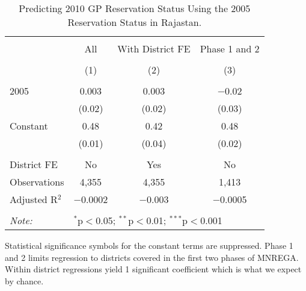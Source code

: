 \begin{table}[!htbp]
\centering
\begin{threeparttable}

  \caption{Predicting 2010 GP Reservation Status Using the 2005 Reservation Status in Rajastan.} 
  \label{rand_or_no_raj} 
\scriptsize 
\begin{tabular}{@{\extracolsep{0pt}}lccc} 
\\[-1.8ex]\hline 
\hline \\[-1.8ex] 
 & All & With District FE & Phase 1 and 2 \\ 
\\[-1.8ex] & (1) & (2) & (3)\\ 
\hline \\[-1.8ex] 
 2005 & 0.003 & 0.003 & $-$0.02 \\ 
  & (0.02) & (0.02) & (0.03) \\ 
  Constant & 0.48 & 0.42 & 0.48 \\ 
  & (0.01) & (0.04) & (0.02) \\ 
 \hline \\[-1.8ex] 
District FE & No & Yes & No \\ 
Observations & 4,355 & 4,355 & 1,413 \\ 
Adjusted R$^{2}$ & $-$0.0002 & $-$0.003 & $-$0.0005 \\ 
\hline 
\hline \\[-1.8ex] 
\textit{Note:}  & \multicolumn{3}{l}{$^{*}$p$<$0.05; $^{**}$p$<$0.01; $^{***}$p$<$0.001} \\ 
\end{tabular} 
\begin{tablenotes}[flushleft]
\scriptsize
\item Statistical significance symbols for the constant terms are suppressed.
                     Phase 1 and 2 limits regression to districts covered in the first two phases of MNREGA.
                     Within district regressions yield 1 significant coefficient which is what we expect by chance.
\end{tablenotes}
\end{threeparttable}
\end{table}
